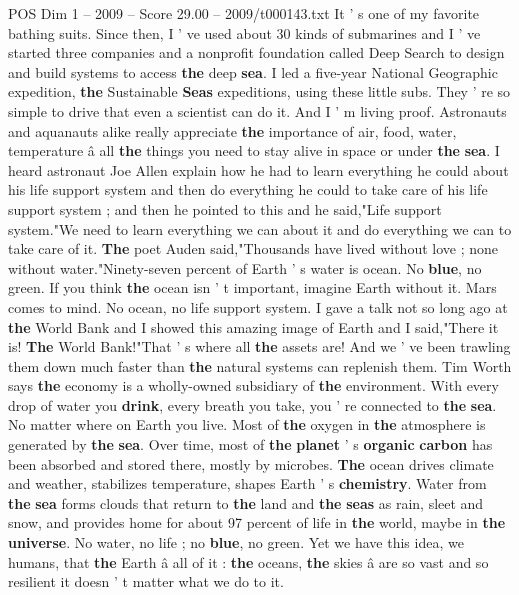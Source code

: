 \begin{textsample}{POS Dim 1 – 2009 – Score 29.00 – 2009/t000143.txt}
It ' s one of my favorite bathing suits.
Since then, I ' ve used about 30 kinds of submarines and I ' ve started three companies and a nonprofit foundation called Deep Search to design and build systems to access \textbf{the} deep \textbf{sea}.
I led a five-year National Geographic expedition, \textbf{the} Sustainable \textbf{Seas} expeditions, using these little subs.
They ' re so simple to drive that even a scientist can do it.
And I ' m living proof.
Astronauts and aquanauts alike really appreciate \textbf{the} importance of air, food, water, temperature â all \textbf{the} things you need to stay alive in space or under \textbf{the} \textbf{sea}.
I heard astronaut Joe Allen explain how he had to learn everything he could about his life support system and then do everything he could to take care of his life support system ; and then he pointed to this and he said,"Life support system."We need to learn everything we can about it and do everything we can to take care of it. \textbf{The} poet Auden said,"Thousands have lived without love ; none without water."Ninety-seven percent of Earth ' s water is ocean.
No \textbf{blue}, no green.
If you think \textbf{the} ocean isn ' t important, imagine Earth without it.
Mars comes to mind.
No ocean, no life support system.
I gave a talk not so long ago at \textbf{the} World Bank and I showed this amazing image of Earth and I said,"There it is! \textbf{The} World Bank!"That ' s where all \textbf{the} assets are!
And we ' ve been trawling them down much faster than \textbf{the} natural systems can replenish them.
Tim Worth says \textbf{the} economy is a wholly-owned subsidiary of \textbf{the} environment.
With every drop of water you \textbf{drink}, every breath you take, you ' re connected to \textbf{the} \textbf{sea}.
No matter where on Earth you live.
Most of \textbf{the} oxygen in \textbf{the} atmosphere is generated by \textbf{the} \textbf{sea}.
Over time, most of \textbf{the} \textbf{planet} ' s \textbf{organic} \textbf{carbon} has been absorbed and stored there, mostly by microbes. \textbf{The} ocean drives climate and weather, stabilizes temperature, shapes Earth ' s \textbf{chemistry}.
Water from \textbf{the} \textbf{sea} forms clouds that return to \textbf{the} land and \textbf{the} \textbf{seas} as rain, sleet and snow, and provides home for about 97 percent of life in \textbf{the} world, maybe in \textbf{the} \textbf{universe}.
No water, no life ; no \textbf{blue}, no green.
Yet we have this idea, we humans, that \textbf{the} Earth â all of it : \textbf{the} oceans, \textbf{the} skies â are so vast and so resilient it doesn ' t matter what we do to it.

\end{textsample}

